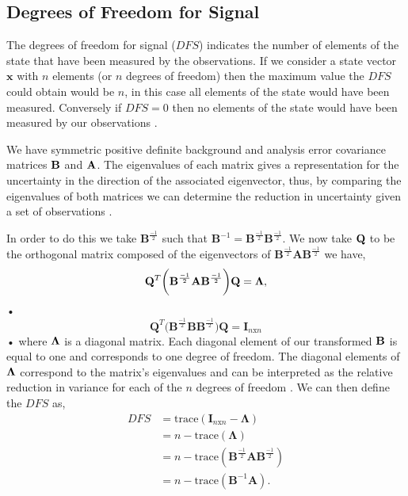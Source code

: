 \documentclass[11pt]{article}
\begin{document}
\subsection{Degrees of Freedom for Signal} \label{DFSintro}%

The degrees of freedom for signal ($DFS$) indicates the number of elements of the state that have been measured by the observations. If we consider a state vector $\textbf{x}$ with $n$ elements (or $n$ degrees of freedom) then the maximum value the $DFS$ could obtain would be $n$, in this case all elements of the state would have been measured. Conversely if $DFS = 0$ then no elements of the state would have been measured by our observations \cite{fowler2011measures}.

We have symmetric positive definite background and analysis error covariance matrices $\bf{B}$ and $\bf{A}$. The eigenvalues of each matrix gives a representation for the uncertainty in the direction of the associated eigenvector, thus, by comparing the eigenvalues of both matrices we can determine the reduction in uncertainty given a set of observations \cite{stewart2008correlated}.

In order to do this we take $\mathbf{B}^{\frac{-1}{2}}$ such that $\mathbf{B}^{-1} = \mathbf{B}^{\frac{-1}{2}}\mathbf{B}^{\frac{-1}{2}}$. We now take $\bf{Q}$ to be the orthogonal matrix composed of the eigenvectors of $\mathbf{B}^{\frac{-1}{2}}\mathbf{A}\mathbf{B}^{\frac{-1}{2}}$ we have,
\begin{equation}
\mathbf{Q}^{T}\bigg(\mathbf{B}^{\frac{-1}{2}}\mathbf{A}\mathbf{B}^{\frac{-1}{2}}\bigg)\mathbf{Q} = \bf{\Lambda},
\end{equation}• 
\begin{equation}
\mathbf{Q}^{T}\bigg(\mathbf{B}^{\frac{-1}{2}}\mathbf{B}\mathbf{B}^{\frac{-1}{2}}\bigg)\mathbf{Q} = \mathbf{I}_{n\text{x}n}
\end{equation}•
where $\bf{\Lambda}$ is a diagonal matrix. Each diagonal element of our transformed $\bf{B}$ is equal to one and corresponds to one degree of freedom. The diagonal elements of $\bf{\Lambda}$ correspond to the matrix's eigenvalues and can be interpreted as the relative reduction in variance for each of the $n$ degrees of freedom \cite{sandu2012practical}. We can then define the $DFS$ as,
\begin{equation}
\begin{split}
DFS & = \text{trace}(\mathbf{I}_{n\text{x}n} - \mathbf{\Lambda}) \\
       & = n - \text{trace}(\mathbf{\Lambda}) \\
       & = n - \text{trace}(\mathbf{B}^{\frac{-1}{2}}\mathbf{A}\mathbf{B}^{\frac{-1}{2}}) \\
       & = n - \text{trace}(\mathbf{B}^{-1}\mathbf{A}).
\end{split}
\end{equation}
\end{document}
